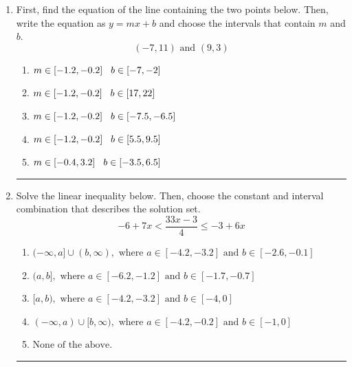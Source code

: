 \documentclass[14pt]{extbook}
\newcommand{\litem}[1]{\item#1\hspace*{-1cm}\rule{\textwidth}{0.4pt}}
\begin{document}
\begin{enumerate}
{\begin{enumerate}[label=\Alph*.]
\end{enumerate} }
\litem{
First, find the equation of the line containing the two points below. Then, write the equation as $ y=mx+b $ and choose the intervals that contain $m$ and $b$.\[ (-7, 11) \text{ and } (9, 3) \]\begin{enumerate}[label=\Alph*.]
\item \( m \in [-1.2, -0.2] \hspace*{3mm} b \in [-7, -2] \)
\item \( m \in [-1.2, -0.2] \hspace*{3mm} b \in [17, 22] \)
\item \( m \in [-1.2, -0.2] \hspace*{3mm} b \in [-7.5, -6.5] \)
\item \( m \in [-1.2, -0.2] \hspace*{3mm} b \in [5.5, 9.5] \)
\item \( m \in [-0.4, 3.2] \hspace*{3mm} b \in [-3.5, 6.5] \)

\end{enumerate} }
\litem{
Solve the linear inequality below. Then, choose the constant and interval combination that describes the solution set.\[ -6 + 7 x < \frac{33 x - 3}{4} \leq -3 + 6 x \]\begin{enumerate}[label=\Alph*.]
\item \( (-\infty, a] \cup (b, \infty), \text{ where } a \in [-4.2, -3.2] \text{ and } b \in [-2.6, -0.1] \)
\item \( (a, b], \text{ where } a \in [-6.2, -1.2] \text{ and } b \in [-1.7, -0.7] \)
\item \( [a, b), \text{ where } a \in [-4.2, -3.2] \text{ and } b \in [-4, 0] \)
\item \( (-\infty, a) \cup [b, \infty), \text{ where } a \in [-4.2, -0.2] \text{ and } b \in [-1, 0] \)
\item \( \text{None of the above.} \)

\end{enumerate} }
\end{enumerate}
\end{document}
